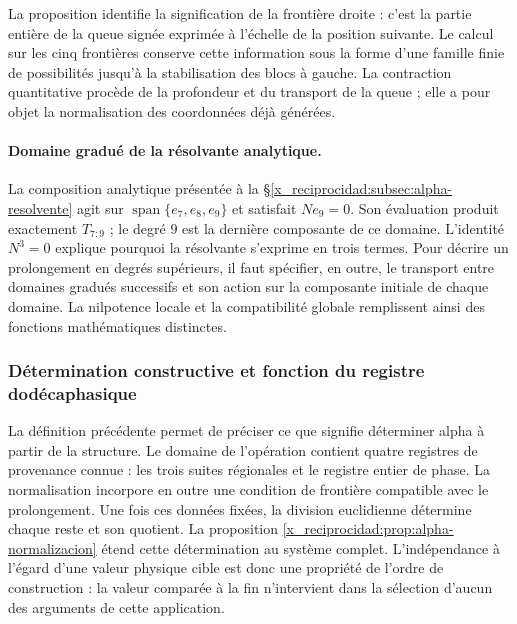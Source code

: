 La proposition identifie la signification de la frontière droite : c'est la
partie entière de la queue signée exprimée à l'échelle de la position
suivante. Le calcul sur les cinq frontières conserve cette information
sous la forme d'une famille finie de possibilités jusqu'à la stabilisation des blocs à
gauche. La contraction quantitative procède de la
profondeur et du transport de la queue ; elle a pour objet la normalisation des
coordonnées déjà générées.

\paragraph{Domaine gradué de la résolvante analytique.}
\label{x_reciprocidad:ampl-alfa-dominio-resolvente}
La composition analytique présentée à la
\S\ref{x_reciprocidad:subsec:alpha-resolvente} agit sur
$\operatorname{span}\{e_7,e_8,e_9\}$ et satisfait $Ne_9=0$. Son
évaluation produit exactement $T_{7:9}$ ; le degré $9$ est la dernière
composante de ce domaine. L'identité $N^3=0$ explique pourquoi la
résolvante s'exprime en trois termes. Pour décrire un
prolongement en degrés supérieurs, il faut spécifier, en outre, le
transport entre domaines gradués successifs et son action sur la
composante initiale de chaque domaine. La nilpotence locale et la
compatibilité globale remplissent ainsi des fonctions mathématiques distinctes.




\subsubsection{Détermination constructive et fonction du registre dodécaphasique}
\label{x_reciprocidad:alpha-ampl-dependencias}

La définition précédente permet de préciser ce que signifie déterminer alpha à partir
de la structure. Le domaine de l'opération contient quatre registres de
provenance connue : les trois suites régionales et le registre entier
de phase. La normalisation incorpore en outre une condition de frontière
compatible avec le prolongement. Une fois ces données fixées, la division
euclidienne détermine chaque reste et son quotient. La proposition
\ref{x_reciprocidad:prop:alpha-normalizacion} étend cette détermination au système
complet. L'indépendance à l'égard d'une valeur physique cible est donc
une propriété de l'ordre de construction : la valeur comparée à la
fin n'intervient dans la sélection d'aucun des arguments de cette
application.

